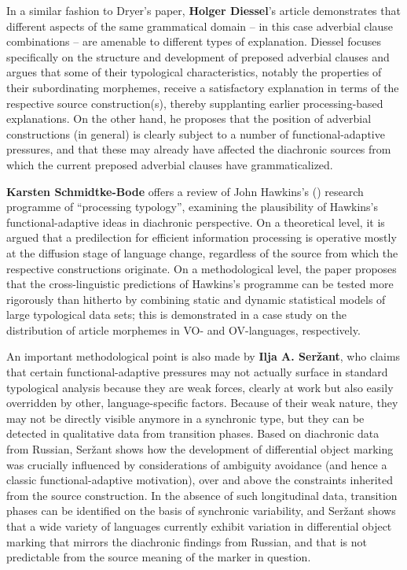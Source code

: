 \documentclass[output=paper]{langsci/langscibook}
\begin{document}
In a similar fashion to Dryer’s paper, \textbf{Holger Diessel}’s article demonstrates that different aspects of the same grammatical domain – in this case adverbial clause combinations – are amenable to different types of explanation. Diessel focuses specifically on the structure and development of preposed adverbial clauses and argues that some of their typological characteristics, notably the properties of their subordinating morphemes, receive a satisfactory explanation in terms of the respective source construction(s), thereby supplanting earlier processing-based explanations. On the other hand, he proposes that the position of adverbial constructions (in general) is clearly subject to a number of functional-adaptive pressures, and that these may already have affected the diachronic sources from which the current preposed adverbial clauses have grammaticalized.

\textbf{Karsten Schmidtke-Bode} offers a review of John Hawkins's (\citeyear{Hawkins2004,Hawkins2014_VarEff}) research programme of “processing typology”, examining the plausibility of Hawkins’s functional-adaptive ideas in diachronic perspective. On a theoretical level, it is argued that a predilection for efficient information processing is operative mostly at the diffusion stage of language change, regardless of the source from which the respective constructions originate. On a methodological level, the paper proposes that the cross-linguistic predictions of Hawkins’s programme can be tested more rigorously than hitherto by combining static and dynamic statistical models of large typological data sets; this is demonstrated in a case study on the distribution of article morphemes in VO- and OV-languages, respectively.

An important methodological point is also made by \textbf{Ilja A. Seržant}, who claims that certain functional-adaptive pressures may not actually surface in standard typological analysis because they are weak forces, clearly at work but also easily overridden by other, language-specific factors. Because of their weak nature, they may not be directly visible anymore in a synchronic type, but they can be detected in qualitative data from transition phases. Based on diachronic data from Russian, Seržant shows how the development of differential object marking was crucially influenced by considerations of ambiguity avoidance (and hence a classic functional-adaptive motivation), over and above the constraints inherited from the source construction. In the absence of such longitudinal data, transition phases can be identified on the basis of synchronic variability, and Seržant shows that a wide variety of languages currently exhibit variation in differential object marking that mirrors the diachronic findings from Russian, and that is not predictable from the source meaning of the marker in question.
\end{document}
